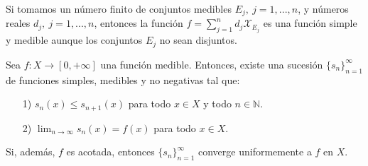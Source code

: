 \begin{obs}
Si tomamos un número finito de conjuntos medibles $E_j, \ j = 1,...,n$, y números reales $d_j, \ j = 1,...,n$, entonces la función $f = \sum_{j = 1}^{n}{d_j \mathcal{X}_{E_j}}$ es una función simple y medible aunque los conjuntos $E_j$ no sean disjuntos.
\end{obs}
\begin{teo}
Sea $f: X \longrightarrow [0, +\infty]$ una función medible. Entonces, existe una sucesión $\{ s_n\}_{n=1}^{\infty}$ de funciones simples, medibles y no negativas tal que:
\begin{enumerate}
    \item[1)] $s_n(x) \leq s_{n+1}(x)$ para todo $x \in X$ y todo $n \in \mathbb{N}$.
    \item[2)] $\lim_{n \to \infty}{s_n(x)} = f(x)$ para todo $x \in X$.
\end{enumerate}
Si, además, $f$ es acotada, entonces $\{ s_n\}_{n=1}^{\infty}$ converge uniformemente a $f$ en $X$.
\end{teo}
